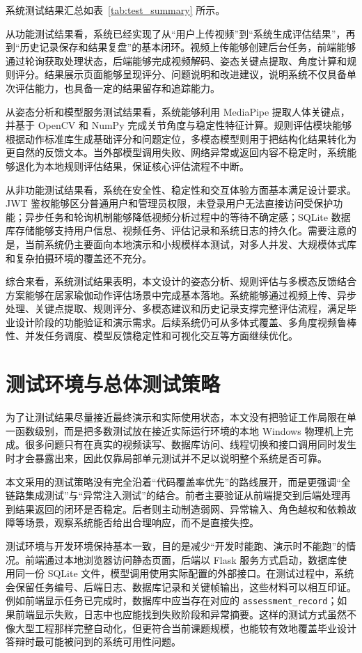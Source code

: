 \documentclass[UTF8,twoside]{ctexrep}
\makeatletter
\def@NAT@last@yr{\@citea}%
\def@NAT@last@yr{-\NAT@penalty}%
\makeatother
\begin{document}
系统测试结果汇总如表~\ref{tab:test_summary} 所示。


从功能测试结果看，系统已经实现了从“用户上传视频”到“系统生成评估结果”，再到“历史记录保存和结果复盘”的基本闭环。视频上传能够创建后台任务，前端能够通过轮询获取处理状态，后端能够完成视频解码、姿态关键点提取、角度计算和规则评分。结果展示页面能够呈现评分、问题说明和改进建议，说明系统不仅具备单次评估能力，也具备一定的结果留存和追踪能力。

从姿态分析和模型服务测试结果看，系统能够利用 MediaPipe 提取人体关键点，并基于 OpenCV 和 NumPy 完成关节角度与稳定性特征计算。规则评估模块能够根据动作标准库生成基础评分和问题定位，多模态模型则用于把结构化结果转化为更自然的反馈文本。当外部模型调用失败、网络异常或返回内容不稳定时，系统能够退化为本地规则评估结果，保证核心评估流程不中断。

从非功能测试结果看，系统在安全性、稳定性和交互体验方面基本满足设计要求。JWT 鉴权能够区分普通用户和管理员权限，未登录用户无法直接访问受保护功能；异步任务和轮询机制能够降低视频分析过程中的等待不确定感；SQLite 数据库存储能够支持用户信息、视频任务、评估记录和系统日志的持久化。需要注意的是，当前系统仍主要面向本地演示和小规模样本测试，对多人并发、大规模体式库和复杂拍摄环境的覆盖还不充分。

综合来看，系统测试结果表明，本文设计的姿态分析、规则评估与多模态反馈结合方案能够在居家瑜伽动作评估场景中完成基本落地。系统能够通过视频上传、异步处理、关键点提取、规则评分、多模态建议和历史记录支撑完整评估流程，满足毕业设计阶段的功能验证和演示需求。后续系统仍可从多体式覆盖、多角度视频鲁棒性、并发任务调度、模型反馈稳定性和可视化交互等方面继续优化。

\iffalse

\section{测试环境与总体测试策略}
为了让测试结果尽量接近最终演示和实际使用状态，本文没有把验证工作局限在单一函数级别，而是把多数测试放在接近实际运行环境的本地 Windows 物理机上完成。很多问题只有在真实的视频读写、数据库访问、线程切换和接口调用同时发生时才会暴露出来，因此仅靠局部单元测试并不足以说明整个系统是否可靠。

本文采用的测试策略没有完全沿着“代码覆盖率优先”的路线展开，而是更强调“全链路集成测试”与“异常注入测试”的结合。前者主要验证从前端提交到后端处理再到结果返回的闭环是否稳定。后者则主动制造弱网、异常输入、角色越权和依赖故障等场景，观察系统能否给出合理响应，而不是直接失控。

测试环境与开发环境保持基本一致，目的是减少“开发时能跑、演示时不能跑”的情况。前端通过本地浏览器访问静态页面，后端以 Flask 服务方式启动，数据库使用同一份 SQLite 文件，模型调用使用实际配置的外部接口。在测试过程中，系统会保留任务编号、后端日志、数据库记录和关键帧输出，这些材料可以相互印证。例如前端显示任务已完成时，数据库中应当存在对应的 \texttt{assessment\_record}；如果前端显示失败，日志中也应能找到失败阶段和异常摘要。这样的测试方式虽然不像大型工程那样完整自动化，但更符合当前课题规模，也能较有效地覆盖毕业设计答辩时最可能被问到的系统可用性问题。
\end{document}
